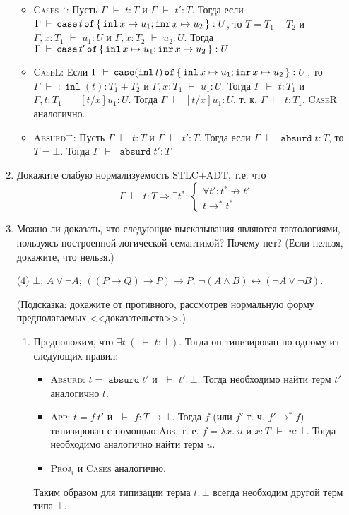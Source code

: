 \documentclass{article}
\DeclareMathOperator{\tinl}{\mathtt{inl}}
\DeclareMathOperator{\tinr}{\mathtt{inr}}
\DeclareMathOperator{\tcase}{\mathtt{case}}
\DeclareMathOperator{\tof}{\mathtt{of}}
\DeclareMathOperator{\tabsurd}{\mathtt{absurd}}
\DeclareMathOperator{\tstl}{\ \vdash\ }
\begin{document}
\begin{enumerate}
\begin{mdframed}
\begin{itemize}
            \item \textsc{Cases$^\to$}: Пусть $\Gamma\tstl t: T$ и $\Gamma\tstl t': T$. Тогда если $\Gamma\tstl\tcase t\tof\set{\tinl x\mapsto u_1;\tinr x\mapsto u_2}: U$, то $T = T_1 + T_2$ и $\Gamma, x: T_1\tstl u_1: U$ и $\Gamma, x: T_2\tstl u_2: U$. Тогда $\Gamma\tstl\tcase t'\tof\set{\tinl x\mapsto u_1;\tinr x\mapsto u_2}: U$
            \item \textsc{CaseL}: Если $\Gamma\tstl\tcase (\tinl t)\tof\set{\tinl x\mapsto u_1;\tinr x\mapsto u_2}: U$, то $\Gamma\tstl: \tinl(t): T_1 + T_2$ и $\Gamma, x: T_1\tstl u_1: U$. Тогда $\Gamma\tstl t: T_1$ и $\Gamma, t: T_1\tstl [t/x]u_1: U$. Тогда $\Gamma\tstl [t/x]u_1: U$, т. к. $\Gamma\tstl t: T_1$. \textsc{CaseR} аналогично.
            \item \textsc{Absurd$^\to$}: Пусть $\Gamma\tstl t: T$ и $\Gamma\tstl t' : T$. Тогда если $\Gamma\tstl \tabsurd t: T$, то $T = \bot$. Тогда $\Gamma\tstl \tabsurd t': T$
        \end{itemize}
    \end{mdframed}


    \item Докажите слабую нормализуемость STLC+ADT, т.е. что
    \[\Gamma\tstl t:T\Rightarrow\exists t^*:\begin{cases}
        \forall t':t^*\not\to t'\\
        t\to^*t^*
    \end{cases}\]


    \item Можно ли доказать, что следующие высказывания являются тавтологиями, пользуясь построенной логической семантикой? Почему нет? (Если нельзя, докажите, что нельзя.)
    \begin{tasks}(4)
        \task $\bot$;
        \task $A\lor\neg A$;
        \task $((P\to Q)\to P)\to P$;
        \task $\neg(A\land B)\leftrightarrow(\neg A\lor\neg B)$.
    \end{tasks}
    (Подсказка: докажите от противного, рассмотрев нормальную форму предполагаемых <<доказательств>>.)

    \begin{mdframed}
        \begin{enumerate}
            \item Предположим, что $\exists t\ (\tstl t: \bot)$. Тогда он типизирован по одному из следующих правил:
            \begin{itemize}
                \item \textsc{Absurd}: $t=\tabsurd t'$ и $\tstl t': \bot$. Тогда необходимо найти терм $t'$ аналогично $t$.
                \item \textsc{App}: $t= f\ t'$ и $\tstl f: T\to \bot$. Тогда $f$ (или $f'$ т. ч. $f'\to^* f$) типизирован с помощью \textsc{Abs}, т. е. $f=\lambda x.\; u$ и $x: T\tstl u: \bot$. Тогда необходимо аналогично найти терм $u$.
                \item \textsc{Proj$_i$} и \textsc{Cases} аналогично.
            \end{itemize}
            Таким образом для типизации терма $t: \bot$ всегда необходим другой терм типа $\bot$.


\end{enumerate}
\end{mdframed}
\end{enumerate}
\end{document}
